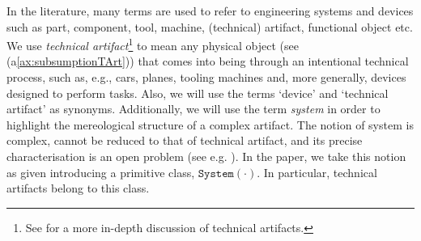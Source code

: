 \documentclass[sw]{iosart2x}
\newcommand{\AxLabel}{\textrm{a}}
\newcommand{\refax}[1]{({\AxLabel}\ref{#1})}
\newcommand{\generalStyle}[1]{\texttt{#1}}
\newcommand{\uniRel}[2]{\generalStyle{#1}(#2)}
\newcommand{\System}[1]{\uniRel{System}{#1}}
\newcommand{\firstTimeKeyWord}[1]{\textit{#1}}
\newcommand{\quotes}[1]{`#1'}
\newcommand{\myComment}[1]{{\unskip \ignorespaces}}
\begin{document}
In the literature, many terms are used to refer to engineering systems and devices such as part, component, tool, machine, (technical) artifact, functional object etc. 
We use \firstTimeKeyWord{technical artifact}\footnote{See \cite{borgoTechnicalArtifactsIntegrated2017} for a more in-depth discussion of technical artifacts.} to mean any physical object (see \refax{ax:subsumptionTArt}) that comes into being through an intentional technical process, such as, e.g., cars, planes, tooling machines and, more generally, devices designed to perform tasks. %
Also, we will use the terms \quotes{device} and \quotes{technical artifact} as synonyms. 
Additionally, we will use the term \firstTimeKeyWord{system} in order to highlight the mereological structure of a complex artifact. 
The notion of system is complex, cannot be reduced to  that of technical artifact, and its precise characterisation is an open problem (see e.g. \cite{mizoguchiRoleSystemicView2021}). In the paper, we take this notion as given introducing a primitive class, $\System{\cdot}$. In particular, technical artifacts belong to this class. 
\end{document}
